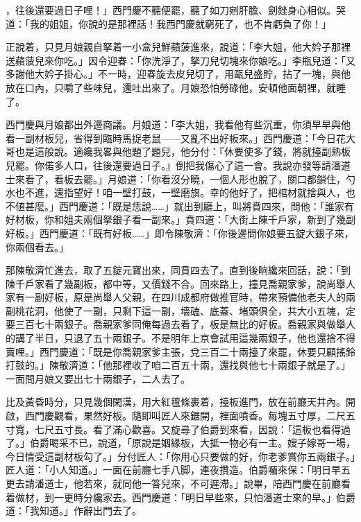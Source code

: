 ，往後還要過日子哩！」{}西門慶不聽便罷，聽了如刀剜肝膽、劍銼身心相似。哭道：「我的姐姐，你說的是那裡話！我西門慶就窮死了，也不肯虧負了你！」

正說着，只見月娘親自拏着一小盒兒鮮蘋菠進來，說道：「李大姐，他大妗子那裡送蘋菠兒來你吃。」因令迎春：「你洗淨了，拏刀兒切塊來你娘吃。」李瓶兒道：「又多謝他大妗子掛心。」不一時，迎春旋去皮兒切了，用甌兒盛貯，拈了一塊，與他放在口內，只嚼了些味兒，還吐出來了。月娘恐怕勞碌他，安頓他面朝裡，就睡了。

西門慶與月娘都出外邊商議。月娘道：「李大姐，我看他有些沉重，你須早早與他看一副材板兒，省得到臨時馬捉老鼠——又亂不出好板來。」西門慶道：「今日花大哥也是這般說。適纔我畧與他題了題兒，他分付：『休要使多了錢，將就擡副熟板兒罷。你偌多人口，往後還要過日子。』倒把我傷心了這一會。我說亦發等請潘道士來看了，看板去罷。」{}月娘道：「你看沒分曉，一個人形也脫了，關口都鎖住，勺水也不進，還指望好！咱一壁打鼓，一壁磨旗。幸的他好了，把棺材就捨與人，也不値甚麼。」西門慶道：「既是恁說……」就出到廳上，叫將賁四來，問他：「誰家有好材板，你和姐夫兩個拏銀子看一副來。」賁四道：「大街上陳千戶家，新到了幾副好板。」西門慶道：「既有好板……」即令陳敬濟：「你後邊問你娘要五錠大銀子來，你兩個看去。」

那陳敬濟忙進去，取了五錠元寶出來，同賁四去了。直到後晌纔來回話，說：「到陳千戶家看了幾副板，都中等，又價錢不合。回來路上，撞見喬親家爹，說尚舉人家有一副好板，原是尚舉人父親，在四川成都府做推官時，帶來預備他老夫人的兩副桃花洞，他使了一副，只剩下這一副，墻磕、底蓋、堵頭俱全，共大小五塊，定要三百七十兩銀子。喬親家爹同俺每過去看了，板是無比的好板。喬親家與做舉人的講了半日，只退了五十兩銀子。不是明年上京會試用這幾兩銀子，他也還捨不得賣哩。」西門慶道：「既是你喬親家爹主張，兌三百二十兩擡了來罷，休要只顧搖鈴打鼓的。」陳敬濟道：「他那裡收了咱二百五十兩，還找與他七十兩銀子就是了。」一面問月娘又要出七十兩銀子，二人去了。

比及黃昏時分，只見幾個閑漢，用大紅氊條裹着，擡板進門，放在前廳天井內。開啟，西門慶觀看，果然好板。隨即叫匠人來鋸開，裡面噴香。每塊五寸厚，二尺五寸寬，七尺五寸長。看了滿心歡喜。又旋尋了伯爵到來看，因說：「這板也看得過了。」伯爵喝采不已，說道，「原說是姻緣板，大抵一物必有一主。嫂子嫁哥一場，今日情受這副材板勾了。」分付匠人：「你用心只要做的好，你老爹賞你五兩銀子。」匠人道：「小人知道。」一面在前廳七手八脚，連夜攢造。伯爵囑來保：「明日早五更去請潘道士，他若來，就同他一答兒來，不可遲滯。」說畢，陪西門慶在前廳看着做材，到一更時分纔家去。西門慶道：「明日早些來，只怕潘道士來的早。」伯爵道：「我知道。」作辭出門去了。

